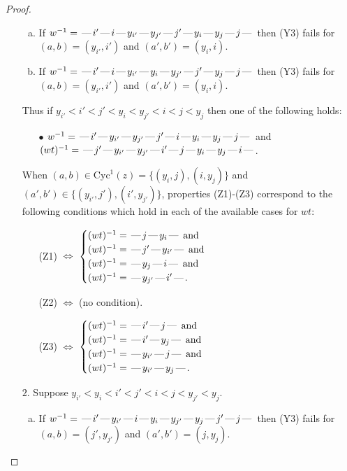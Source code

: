 \documentclass[10pt]{article}
\theoremstyle{definition}
\theoremstyle{definition}
\def\dash{\text{\hspace{0.5mm}---\hspace{0.5mm}}}
\def\Cyc{\mathrm{Cyc}}
\begin{document}
\begin{proof}
\begin{enumerate}
\begin{enumerate}[(a)]
\item If $w^{-1} = \dash i'\dash i\dash y_{i'}\dash y_{j'}\dash j'\dash y_i\dash y_j\dash j\dash $ then (Y3) fails for $(a,b)=(y_{i'},i')$ and $(a',b')=(y_i,i)$.
\item If $w^{-1} = \dash i'\dash i\dash y_{i'}\dash y_i\dash y_{j'}\dash j'\dash y_j\dash j\dash $ then (Y3) fails for $(a,b)=(y_{i'},i')$ and $(a',b')=(y_i,i)$.
\end{enumerate}
Thus if $y_{i'} < i' < j' < y_i < y_{j'} < i < j < y_j$ then one of the following holds:
\begin{enumerate}
\item[$\bullet$] $w^{-1} = \dash i'\dash y_{i'}\dash y_{j'}\dash j'\dash i\dash y_i\dash y_j\dash j\dash $ and $(wt)^{-1} = \dash j'\dash y_{i'}\dash y_{j'}\dash i'\dash j\dash y_i\dash y_j\dash i\dash $.
\end{enumerate}
When $(a,b)\in\Cyc^1(z)=\{(y_i,j),(i,y_j)\}$ and $(a',b')\in\{(y_{i'},j'),(i',y_{j'})\}$,
properties (Z1)-(Z3) correspond to the following conditions which
hold in each of the available cases for $wt$:
\begin{enumerate}
\item[](Z1) $\Leftrightarrow$ $\begin{cases}\text{$(wt)^{-1} = \dash j \dash y_i \dash$}\text{ and }\\
\text{$(wt)^{-1} = \dash j' \dash y_{i'} \dash$}\text{ and }\\
\text{$(wt)^{-1} = \dash y_j \dash i \dash$}\text{ and }\\
\text{$(wt)^{-1} = \dash y_{j'} \dash i' \dash$}.\end{cases}$
\item[](Z2) $\Leftrightarrow$ (no condition).
\item[](Z3) $\Leftrightarrow$ $\begin{cases}\text{$(wt)^{-1} = \dash i' \dash j \dash$}\text{ and }\\
\text{$(wt)^{-1} = \dash i' \dash y_j \dash$}\text{ and }\\
\text{$(wt)^{-1} = \dash y_{i'} \dash j \dash$}\text{ and }\\
\text{$(wt)^{-1} = \dash y_{i'} \dash y_j \dash$}.\end{cases}$
\end{enumerate}
\item[$2$.] Suppose $y_{i'} < y_i < i' < j' < i < j < y_{j'} < y_j$.
\begin{enumerate}[(a)]
\item If $w^{-1} = \dash i'\dash y_{i'}\dash i\dash y_i\dash y_{j'}\dash y_j\dash j'\dash j\dash $ then (Y3) fails for $(a,b)=(j',y_{j'})$ and $(a',b')=(j,y_j)$.

\end{enumerate}
\end{enumerate}
\end{proof}
\end{document}

